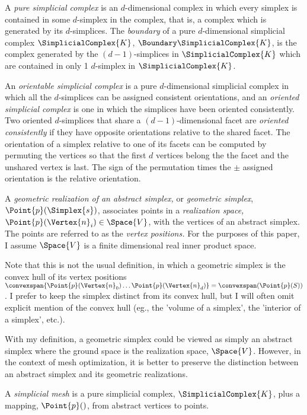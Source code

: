 A {\it pure simplicial complex} is an $d$-dimensional complex
in which every simplex is contained in some $d$-simplex in the complex,
that is, a complex which is generated by its $d$-simplices.
The {\it boundary} of a pure $d$-dimensional simplicial complex $\SimplicialComplex{K}$,
$\Boundary \SimplicialComplex{K}$,
is the complex generated by the $(d-1)$-simplices in $\SimplicialComplex{K}$
which are contained in only 1 $d$-simplex in $\SimplicialComplex{K}$.

An {\it orientable simplicial complex} is a pure $d$-dimensional simplicial complex
in which all the $d$-simplices can be assigned consistent orientations,
and an {\it oriented simplicial complex} is one in which the simplices
have been oriented consistently.
Two oriented $d$-simplices that share a $(d-1)$-dimensional facet
are {\it oriented consistently} if they have opposite orientations
relative to the shared facet. The orientation of a simplex relative to
one of its facets can be computed by permuting the vertices so that
the first $d$ vertices belong the the facet and the unshared vertex is last.
The sign of the permutation times the $\pm$ assigned orientation
is the relative orientation.




A {\it geometric realization of an abstract simplex,}
or {\it geometric simplex}, $\Point{p}(\Simplex{s})$,  associates points
in a {\it realization space,}
$\Point{p} ( \Vertex{n}_i ) \in \Space{V}$, with the vertices of an abstract simplex.
The points are referred to as the {\it vertex positions.}
For the purposes of this paper,
I assume $\Space{V}$ is
a finite dimensional real inner product space.

Note that this is not the usual definition,
in which a geometric simplex is the convex hull of its vertex positions
$\convexspan \{ \Point{p}(\Vertex{n}_0) \ldots \Point{p}(\Vertex{n}_d) \} 
= \convexspan ( \Point{p}(S) )$.
I prefer to keep the simplex distinct from its convex hull,
but I will often omit explicit mention of the convex hull
(eg., the 'volume of a simplex', the 'interior of a simplex', etc.).

With my definition,
a geometric simplex could be viewed as simply an abstract simplex
where the ground space is the realization space, $\Space{V}$.
However, in the context of mesh optimization,
it is better to preserve the distinction between an abstract simplex
and its geometric realizations.

A {\it simplicial mesh} is a pure simplicial complex, $\SimplicialComplex{K}$,
plus a mapping, $\Point{p}()$, from abstract vertices to points.

